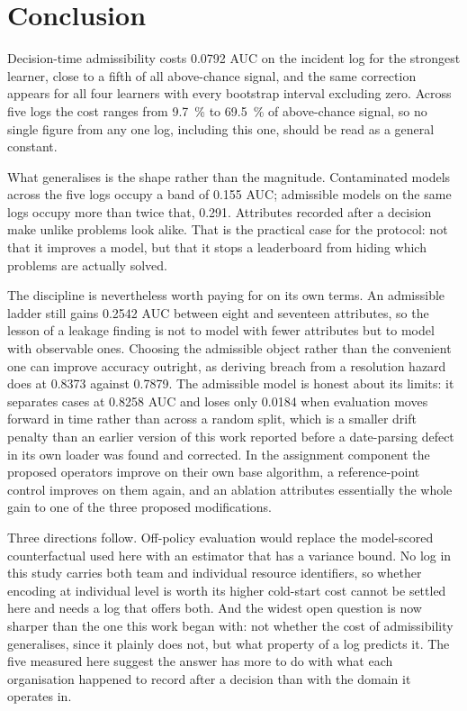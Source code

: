 \section{Conclusion}

Decision-time admissibility costs \num{0.0792} AUC on the incident log for the strongest
learner, close to a fifth of all above-chance signal, and the same correction appears for all
four learners with every bootstrap interval excluding zero. Across five logs the cost ranges
from \SI{9.7}{\percent} to \SI{69.5}{\percent} of above-chance signal, so no single figure
from any one log, including this one, should be read as a general constant.

What generalises is the shape rather than the magnitude. Contaminated models across the five
logs occupy a band of \num{0.155} AUC; admissible models on the same logs occupy
more than twice that, \num{0.291}. Attributes recorded after a decision make unlike problems look alike. That is the
practical case for the protocol: not that it improves a model, but that it stops a leaderboard
from hiding which problems are actually solved.

The discipline is nevertheless worth paying for on its own terms. An admissible ladder still
gains \num{0.2542} AUC between eight and seventeen attributes, so the lesson of a leakage
finding is not to model with fewer attributes but to model with observable ones. Choosing the
admissible object rather than the convenient one can improve accuracy outright, as deriving
breach from a resolution hazard does at \num{0.8373} against \num{0.7879}. The admissible
model is honest about its limits: it separates cases at \num{0.8258} AUC and loses only
\num{0.0184} when evaluation moves forward in time rather than across a random split, which is
a smaller drift penalty than an earlier version of this work reported before a date-parsing
defect in its own loader was found and corrected. In the assignment component the proposed
operators improve on their own base algorithm, a reference-point control improves on them
again, and an ablation attributes essentially the whole gain to one of the three proposed
modifications.

Three directions follow. Off-policy evaluation would replace the model-scored counterfactual
used here with an estimator that has a variance bound. No log in this study carries both team
and individual resource identifiers, so whether encoding at individual level is worth its
higher cold-start cost cannot be settled here and needs a log that offers both. And the widest
open question is now sharper than the one this work began with: not whether the cost of
admissibility generalises, since it plainly does not, but what property of a log predicts it.
The five measured here suggest the answer has more to do with what each organisation happened
to record after a decision than with the domain it operates in.

